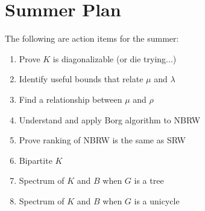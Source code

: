 \documentclass[11pt]{article}
\begin{document}
\section{Summer Plan}

The following are action items for the summer:
\begin{enumerate}
\item Prove $K$ is diagonalizable (or die trying...)
\item Identify useful bounds that relate $\mu$ and $\lambda$
\item Find a relationship between $\mu$ and $\rho$
\item Understand and apply Borg algorithm to NBRW
\item Prove ranking of NBRW is the same as SRW
\item Bipartite $K$
\item Spectrum of $K$ and $B$ when $G$ is a tree
\item Spectrum of $K$ and $B$ when $G$ is a unicycle
\end{enumerate}
\end{document}
